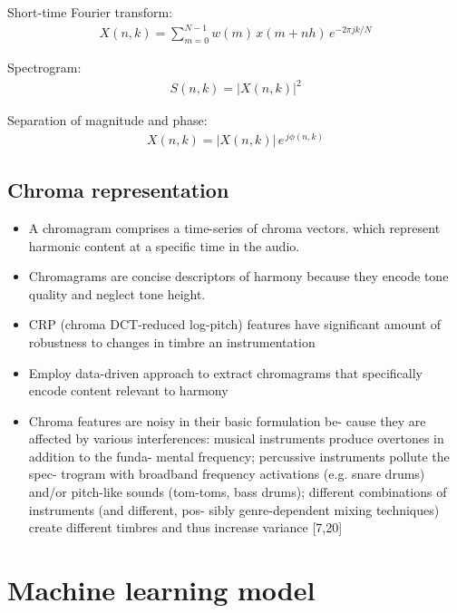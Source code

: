 \documentclass{article}
\begin{document}
Short-time Fourier transform:
\begin{align}
X(n,k) = \sum_{m = 0}^{N-1} w(m) \, x(m + n  h) \, e^{-2 \pi j  k /N}
\end{align} 

Spectrogram: 
\begin{align}
S(n,k) = |X(n,k)|^2
\end{align} 

Separation of magnitude and phase:
\begin{align} 
X(n,k) = |X(n,k)| \, e^{\, j \phi(n,k)}
\end{align} 


\subsection{Chroma representation}

\begin{itemize}
\item A chromagram comprises a time-series of chroma vectors. which represent harmonic content at a specific time in the audio.
\item Chromagrams are concise descriptors of harmony because they encode tone quality and neglect tone height.
\item CRP (chroma DCT-reduced log-pitch) features have significant amount of robustness to changes in timbre an instrumentation \cite[Mueller2010]{Mueller2010}
\item Employ data-driven approach to extract chromagrams that specifically encode content relevant to harmony 
\item Chroma features are noisy in their basic formulation be- cause they are affected by various interferences: musical instruments produce overtones in addition to the funda- mental frequency; percussive instruments pollute the spec- trogram with broadband frequency activations (e.g. snare drums) and/or pitch-like sounds (tom-toms, bass drums); different combinations of instruments (and different, pos- sibly genre-dependent mixing techniques) create different timbres and thus increase variance [7,20] \cite{Korzeniowski2016}
\end{itemize}





\section{Machine learning model}
\end{document}
